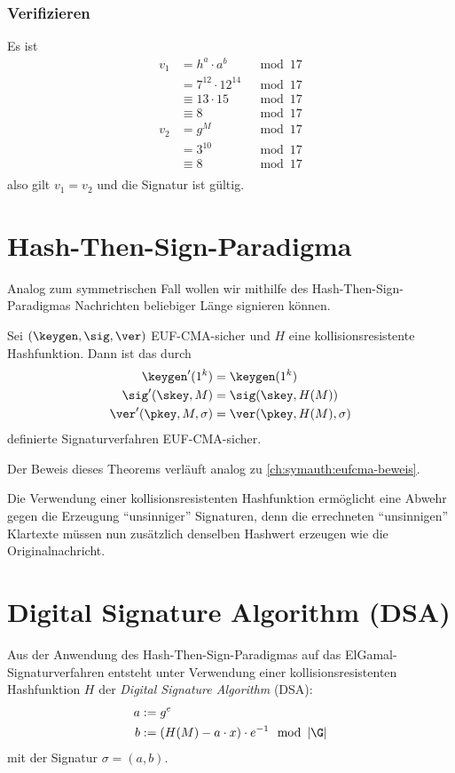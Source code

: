       \subsubsection*{Verifizieren}
      Es ist
      \begin{align*}
        v_1 & = h^a \cdot a^b  & \mod 17 \\
            & = 7^{12} \cdot 12^{14} & \mod 17 \\
            & \equiv 13 \cdot 15 & \mod 17 \\
            & \equiv 8 & \mod 17 \\
        v_2 & = g^M & \mod 17 \\
            &= 3^{10} & \mod 17\\
            &\equiv 8 & \mod 17\\
      \end{align*}
      also gilt $v_1=v_2$ und die Signatur ist gültig.
     

      \section{Hash-Then-Sign-Paradigma}
      Analog zum symmetrischen Fall wollen wir mithilfe des
      Hash-Then-Sign-Paradigmas Nachrichten beliebiger Länge signieren können.
      \begin{theorem}
        Sei $(\keygen, \sig, \ver)$ EUF-CMA-sicher und $H$ eine
        kollisionsresistente Hashfunktion. Dann ist das durch  
        \begin{align*}
          \keygen'(1^k) &= \keygen(1^k)\\
          \sig'(\skey,M) &= \sig(\skey,H(M))\\
          \ver'(\pkey,M,\sigma) &= \ver(\pkey,H(M),\sigma)
        \end{align*}
        definierte Signaturverfahren EUF-CMA-sicher.~\\
      \end{theorem}

      Der Beweis dieses Theorems verläuft analog zu \ref{ch:symauth:eufcma-beweis}.

      Die Verwendung einer kollisionsresistenten Hashfunktion ermöglicht
      eine Abwehr gegen die Erzeugung "`unsinniger"' Signaturen, denn
      die errechneten "`unsinnigen"' Klartexte müssen nun zusätzlich
      denselben Hashwert erzeugen wie die Originalnachricht. 


\section{Digital Signature Algorithm (DSA)}
Aus der Anwendung des Hash-Then-Sign-Paradigmas auf das ElGamal-Signaturverfahren entsteht unter Verwendung einer kollisionsresistenten
Hashfunktion $H$ der \emph{Digital Signature Algorithm} (DSA):
\begin{align*}
a &:= g^e\\
b &:= (H(M) - a \cdot x) \cdot e^{-1} \mod \left|\G\right|
\end{align*}
mit der Signatur $\sigma = (a,b)$.

